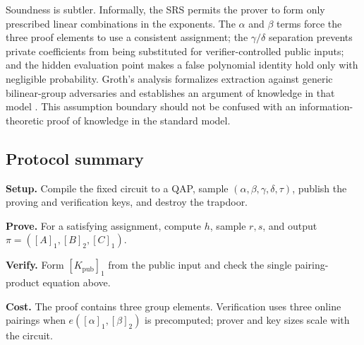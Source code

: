 Soundness is subtler. Informally, the SRS permits the prover to form only prescribed linear combinations in the exponents. The $\alpha$ and $\beta$ terms force the three proof elements to use a consistent assignment; the $\gamma/\delta$ separation prevents private coefficients from being substituted for verifier-controlled public inputs; and the hidden evaluation point makes a false polynomial identity hold only with negligible probability. Groth's analysis formalizes extraction against generic bilinear-group adversaries and establishes an argument of knowledge in that model \cite{Groth2016}. This assumption boundary should not be confused with an information-theoretic proof of knowledge in the standard model.

\subsection{Protocol summary}

\begin{tcolorbox}[enhanced,colback=blue!3!white,colframe=blue!45!black,
                  arc=2.5pt,boxrule=1pt,left=6pt,right=6pt,top=5pt,bottom=5pt]
\small
\textbf{Setup.} Compile the fixed circuit to a QAP, sample
$(\alpha,\beta,\gamma,\delta,\tau)$, publish the proving and verification keys, and destroy the trapdoor.

\medskip
\textbf{Prove.} For a satisfying assignment, compute $h$, sample $r,s$, and output
$\pi=([A]_1,[B]_2,[C]_1)$.

\medskip
\textbf{Verify.} Form $[K_{\mathrm{pub}}]_1$ from the public input and check the single pairing-product equation above.

\medskip
\textbf{Cost.} The proof contains three group elements. Verification uses three online pairings when $e([\alpha]_1,[\beta]_2)$ is precomputed; prover and key sizes scale with the circuit.
\end{tcolorbox}
